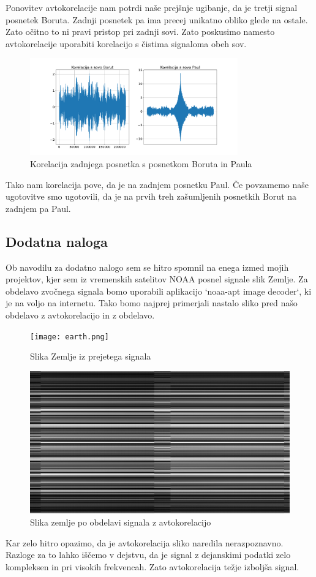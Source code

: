 \documentclass{article}
\begin{document}
Ponovitev avtokorelacije nam potrdi naše prejšnje ugibanje, da je tretji signal posnetek Boruta. Zadnji posnetek pa ima precej unikatno obliko glede na ostale. Zato očitno to ni pravi pristop pri zadnji sovi. Zato poskusimo namesto avtokorelacije uporabiti korelacijo s čistima signaloma obeh sov.
\begin{figure}[H]
    \centering
    \includegraphics[width=0.8\textwidth]{autocorlast.pdf}
	\caption{Korelacija zadnjega posnetka s posnetkom Boruta in Paula}
    \label{fig:example}
\end{figure}
Tako nam korelacija pove, da je na zadnjem posnetku Paul. Če povzamemo naše ugotovitve smo ugotovili, da je na prvih treh zašumljenih posnetkih Borut na zadnjem pa Paul.
\subsection{Dodatna naloga}
Ob navodilu za dodatno nalogo sem se hitro spomnil na enega izmed mojih projektov, kjer sem iz vremenskih satelitov NOAA posnel signale slik Zemlje. Za obdelavo zvočnega signala bomo uporabili aplikacijo `noaa-apt image decoder`, ki je na voljo na internetu. Tako bomo najprej primerjali nastalo sliko pred našo obdelavo z avtokorelacijo in z obdelavo.  
\begin{figure}[H]
    \begin{minipage}{0.5\textwidth}
        \centering
        \texttt{[image: earth.png]}
		\caption{Slika Zemlje iz prejetega signala}
    \end{minipage}%
    \hfill
    \begin{minipage}{0.45\textwidth}
        \centering
        \includegraphics[width=\textwidth]{earthafter.png}
		\caption{Slika zemlje po obdelavi signala z avtokorelacijo}
    \end{minipage}
\end{figure}
Kar zelo hitro opazimo, da je avtokorelacija sliko naredila nerazpoznavno. Razloge za to lahko iščemo v dejstvu, da je signal z dejanskimi podatki zelo kompleksen in pri visokih frekvencah. Zato avtokorelacija težje izboljša signal.
\end{document}
